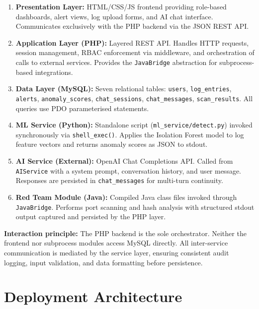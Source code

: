 \documentclass[12pt,a4paper]{article}
\begin{document}
\begin{enumerate}[leftmargin=*,itemsep=3pt]
  \item \textbf{Presentation Layer:} HTML/CSS/JS frontend providing role-based
    dashboards, alert views, log upload forms, and AI chat interface. Communicates
    exclusively with the PHP backend via the JSON REST API.

  \item \textbf{Application Layer (PHP):} Layered REST API. Handles HTTP requests,
    session management, RBAC enforcement via middleware, and orchestration of
    calls to external services. Provides the \texttt{JavaBridge} abstraction for
    subprocess-based integrations.

  \item \textbf{Data Layer (MySQL):} Seven relational tables:
    \texttt{users}, \texttt{log\_entries}, \texttt{alerts},
    \texttt{anomaly\_scores}, \texttt{chat\_sessions}, \texttt{chat\_messages},
    \texttt{scan\_results}. All queries use PDO parameterised statements.

  \item \textbf{ML Service (Python):} Standalone script (\texttt{ml\_service/detect.py})
    invoked synchronously via \texttt{shell\_exec()}. Applies the Isolation Forest
    model to log feature vectors and returns anomaly scores as JSON to stdout.

  \item \textbf{AI Service (External):} OpenAI Chat Completions API. Called from
    \texttt{AIService} with a system prompt, conversation history, and user message.
    Responses are persisted in \texttt{chat\_messages} for multi-turn continuity.

  \item \textbf{Red Team Module (Java):} Compiled Java class files invoked through
    \texttt{JavaBridge}. Performs port scanning and hash analysis with structured
    stdout output captured and persisted by the PHP layer.
\end{enumerate}

\textbf{Interaction principle:} The PHP backend is the sole orchestrator. Neither the
frontend nor subprocess modules access MySQL directly. All inter-service communication
is mediated by the service layer, ensuring consistent audit logging, input validation,
and data formatting before persistence.

\section{Deployment Architecture}
\end{document}
